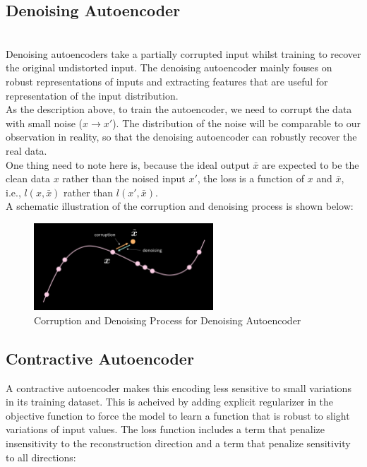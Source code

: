 \subsection{Denoising Autoencoder}
\\
Denoising autoencoders take a partially corrupted input whilst training to recover the original undistorted input. The denoising autoencoder mainly fouses on robust representations of inputs and extracting features that are useful for representation of the input distribution.
\\
As the description above, to train the autoencoder, we need to corrupt the data with small noise ($x \rightarrow x'$). The distribution of the noise will be comparable to our observation in reality, so that the denoising autoencoder can robustly recover the real data.
\\One thing need to note here is, because the ideal output $\bar{x}$ are expected to be the clean data $x$ rather than the noised input $x'$, the loss is a function of $x$ and $\bar{x}$, i.e., $l(x,\bar{x})$ rather than $l(x',\bar{x})$.
\\
A schematic illustration of the corruption and denoising process is shown below:
\\
\begin{figure}[htb]
    \centering
    \includegraphics[width=0.6\textwidth]{labs/09/images/Corrpution_and_Denoising.png}
    \caption{Corruption and Denoising Process for Denoising Autoencoder}
    \label{fig:Corrpution_and_Denoising}
\end{figure}

\subsection{Contractive Autoencoder}

A contractive autoencoder makes this encoding less sensitive to small variations in its training dataset. This is acheived by adding explicit regularizer in the objective function to force the model to learn a function that is robust to slight variations of input values. The loss function includes a term that penalize insensitivity to the reconstruction direction and a term that penalize sensitivity to all directions:

